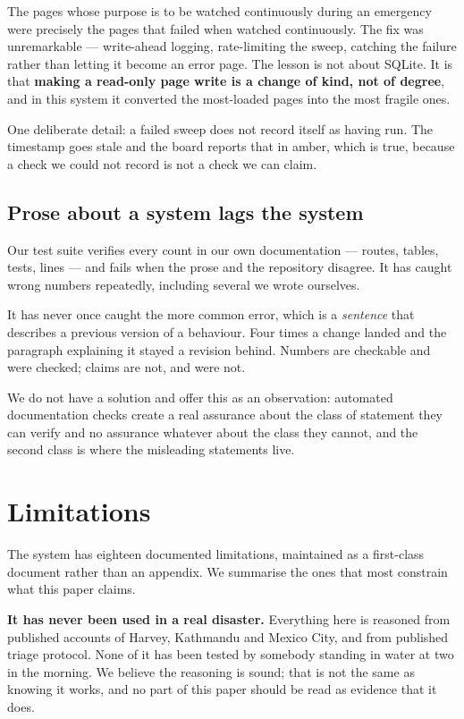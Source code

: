 The pages whose purpose is to be watched continuously during an
emergency were precisely the pages that failed when watched
continuously. The fix was unremarkable --- write-ahead logging,
rate-limiting the sweep, catching the failure rather than letting it
become an error page. The lesson is not about SQLite. It is that
\textbf{making a read-only page write is a change of kind, not of
degree}, and in this system it converted the most-loaded pages into the
most fragile ones.

One deliberate detail: a failed sweep does not record itself as having
run. The timestamp goes stale and the board reports that in amber, which
is true, because a check we could not record is not a check we can
claim.

\subsection{Prose about a system lags the system}

Our test suite verifies every count in our own documentation --- routes,
tables, tests, lines --- and fails when the prose and the repository
disagree. It has caught wrong numbers repeatedly, including several we
wrote ourselves.

It has never once caught the more common error, which is a
\emph{sentence} that describes a previous version of a behaviour. Four
times a change landed and the paragraph explaining it stayed a revision
behind. Numbers are checkable and were checked; claims are not, and were
not.

We do not have a solution and offer this as an observation: automated
documentation checks create a real assurance about the class of
statement they can verify and no assurance whatever about the class they
cannot, and the second class is where the misleading statements live.

\section{Limitations}

The system has eighteen documented limitations, maintained as a
first-class document rather than an appendix. We summarise the ones that
most constrain what this paper claims.

\textbf{It has never been used in a real disaster.} Everything here is
reasoned from published accounts of Harvey, Kathmandu and Mexico City,
and from published triage protocol. None of it has been tested by
somebody standing in water at two in the morning. We believe the
reasoning is sound; that is not the same as knowing it works, and no
part of this paper should be read as evidence that it does.

